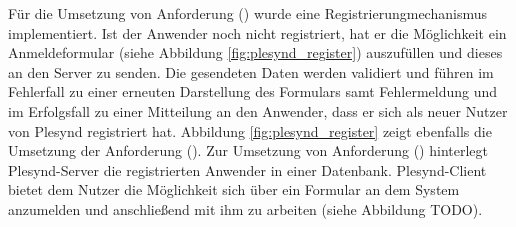 Für die Umsetzung von Anforderung  (\emph{\requirementRegistrieren}) wurde eine Registrierungmechanismus implementiert. Ist der Anwender noch nicht registriert, hat er die Möglichkeit ein Anmeldeformular (siehe Abbildung \ref{fig:plesynd_register}) auszufüllen und dieses an den Server zu senden. Die gesendeten Daten werden validiert und führen im Fehlerfall zu einer erneuten Darstellung des Formulars samt Fehlermeldung und im Erfolgsfall zu einer Mitteilung an den Anwender, dass er sich als neuer Nutzer von Plesynd registriert hat. Abbildung \ref{fig:plesynd_register} zeigt ebenfalls die Umsetzung der Anforderung  (\emph{\requirementUniqueLoginEmail}). Zur Umsetzung von Anforderung  (\emph{\requirementLogin}) hinterlegt Plesynd-Server die registrierten Anwender in einer Datenbank. Plesynd-Client bietet dem Nutzer die Möglichkeit sich über ein Formular an dem System anzumelden und anschließend mit ihm zu arbeiten (siehe Abbildung TODO).
